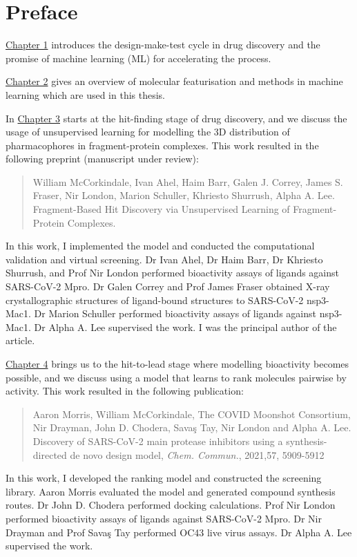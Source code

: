 \chapter*{Preface}
\hyperref[ch:intro]{Chapter 1} introduces the design-make-test cycle in drug discovery and the promise of machine learning (ML) for accelerating the process.

\hyperref[ch:background]{Chapter 2} gives an overview of molecular featurisation and methods in machine learning which are used in this thesis.

In \hyperref[ch:fresco]{Chapter 3} starts at the hit-finding stage of drug discovery, and we discuss the usage of unsupervised learning for modelling the 3D distribution of pharmacophores in fragment-protein complexes. This work resulted in the following preprint (manuscript under review):
\begin{quote}
William McCorkindale, Ivan Ahel, Haim Barr, Galen J. Correy, James S. Fraser, Nir London, Marion Schuller, Khriesto Shurrush, Alpha A. Lee. Fragment-Based Hit Discovery via Unsupervised Learning of Fragment-Protein Complexes.
\end{quote}
In this work, I implemented the model and conducted the computational validation and virtual screening. Dr Ivan Ahel, Dr Haim Barr, Dr Khriesto Shurrush, and Prof Nir London performed bioactivity assays of ligands against SARS-CoV-2 Mpro. Dr Galen Correy and Prof James Fraser obtained X-ray crystallographic structures of ligand-bound structures to SARS-CoV-2 nsp3-Mac1. Dr Marion Schuller performed bioactivity assays of ligands against nsp3-Mac1. Dr Alpha A. Lee supervised the work. I was the principal author of the article.

\hyperref[ch:ranking]{Chapter 4} brings us to the hit-to-lead stage where modelling bioactivity becomes possible, and we discuss using a model that learns to rank molecules pairwise by activity. This work resulted in the following publication:
\begin{quote}
Aaron Morris, William McCorkindale, The COVID Moonshot Consortium, Nir Drayman, John D. Chodera, Savaş Tay, Nir London and Alpha A. Lee. Discovery of SARS-CoV-2 main protease inhibitors using a synthesis-directed de novo design model, \textit{Chem. Commun.}, 2021,57, 5909-5912 
\end{quote}
In this work, I developed the ranking model and constructed the screening library. Aaron Morris evaluated the model and generated compound synthesis routes. Dr John D. Chodera performed docking calculations. Prof Nir London performed bioactivity assays of ligands against SARS-CoV-2 Mpro. Dr Nir Drayman and Prof Savaş Tay performed OC43 live virus assays.  Dr Alpha A. Lee supervised the work.

